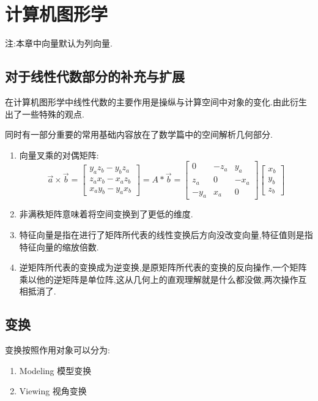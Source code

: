 \section{计算机图形学}{
  注:本章中向量默认为列向量.

  \subsection{对于线性代数部分的补充与扩展}{

    在计算机图形学中线性代数的主要作用是操纵与计算空间中对象的变化.由此衍生出了一些特殊的观点.

    同时有一部分重要的常用基础内容放在了数学篇中的空间解析几何部分.

    \begin{enumerate}
      \item {向量叉乘的对偶矩阵:
            $$\vec{a} \times \vec{b}
              =
              \begin{bmatrix}
                y_az_b - y_bz_a \\
                z_ax_b - x_az_b \\
                x_ay_b - y_ax_b
              \end{bmatrix}
              =
              A * \vec{b}
              =
              \begin{bmatrix}
                0    & -z_a & y_a  \\
                z_a  & 0    & -x_a \\
                -y_a & x_a  & 0
              \end{bmatrix}
              \begin{bmatrix}
                x_b \\
                y_b \\
                z_b
              \end{bmatrix}
            $$
            }
      \item 非满秩矩阵意味着将空间变换到了更低的维度.
      \item 特征向量是指在进行了矩阵所代表的线性变换后方向没改变向量,特征值则是指特征向量的缩放倍数.
      \item 逆矩阵所代表的变换成为逆变换,是原矩阵所代表的变换的反向操作,一个矩阵乘以他的逆矩阵是单位阵,这从几何上的直观理解就是什么都没做,两次操作互相抵消了.
    \end{enumerate}
  }

  \subsection{变换}{
    变换按照作用对象可以分为:
    \begin{enumerate}
      \item Modeling 模型变换
      \item Viewing 视角变换
    \end{enumerate}

}}
